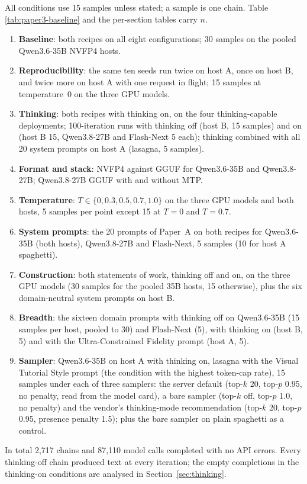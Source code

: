 \documentclass[11pt]{article}
\begin{document}
All conditions use 15 samples unless stated; a sample is one chain. Table
\ref{tab:paper3-baseline} and the per-section tables carry $n$.
\begin{enumerate}[leftmargin=*]
  \item \textbf{Baseline}: both recipes on all eight configurations; 30
        samples on the pooled Qwen3.6-35B NVFP4 hosts.
  \item \textbf{Reproducibility}: the same ten seeds run twice on host A,
        once on host B, and twice more on host A with one request in
        flight; 15 samples at temperature~0 on the three GPU models.
  \item \textbf{Thinking}: both recipes with thinking on, on the four
        thinking-capable deployments; 100-iteration runs with thinking off
        (host B, 15 samples) and on (host B 15, Qwen3.8-27B and Flash-Next
        5 each); thinking combined with all 20 system prompts on host A
        (lasagna, 5 samples).
  \item \textbf{Format and stack}: NVFP4 against GGUF for Qwen3.6-35B and
        Qwen3.8-27B; Qwen3.8-27B GGUF with and without MTP.
  \item \textbf{Temperature}: $T\in\{0,0.3,0.5,0.7,1.0\}$ on the three GPU
        models and both hosts, 5 samples per point except 15 at $T=0$ and
        $T=0.7$.
  \item \textbf{System prompts}: the 20 prompts of Paper~A on both recipes
        for Qwen3.6-35B (both hosts), Qwen3.8-27B and Flash-Next, 5 samples
        (10 for host A spaghetti).
  \item \textbf{Construction}: both statements of work, thinking off and on,
        on the three GPU models (30 samples for the pooled 35B hosts, 15
        otherwise), plus the six domain-neutral system prompts on host B.
  \item \textbf{Breadth}: the sixteen domain prompts with thinking off on
        Qwen3.6-35B (15 samples per host, pooled to 30) and Flash-Next (5),
        with thinking on (host B, 5) and with the Ultra-Constrained Fidelity
        prompt (host A, 5).
  \item \textbf{Sampler}: Qwen3.6-35B on host A with thinking on, lasagna with
        the Visual Tutorial Style prompt (the condition with the highest
        token-cap rate), 15 samples under each of three samplers: the server
        default (top-$k$ 20, top-$p$ 0.95, no penalty, read from the model
        card), a bare sampler (top-$k$ off, top-$p$ 1.0, no penalty) and the
        vendor's thinking-mode recommendation (top-$k$ 20, top-$p$ 0.95,
        presence penalty 1.5); plus the bare sampler on plain spaghetti as a
        control.
\end{enumerate}
In total 2{,}717 chains and 87{,}110 model calls completed with no API
errors. Every thinking-off chain produced text at every iteration; the
empty completions in the thinking-on conditions are analysed in
Section~\ref{sec:thinking}.
\end{document}
